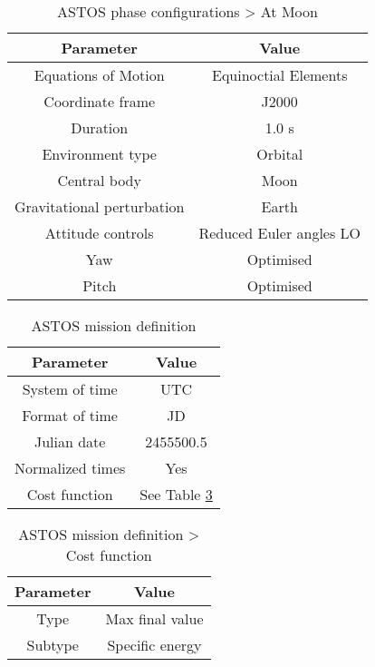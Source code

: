 \begin{table}
\caption{ASTOS phase configurations > At Moon}
\label{tab:ASTOS-phase-configurations>at-moon}
\begin{center}
\begin{tabular}{|cc|}
\hline
Parameter & Value\\
\hline
\hline
Equations of Motion & Equinoctial Elements\\
Coordinate frame & J2000\\
Duration & 1.0 s\\
Environment type & Orbital\\
Central body & Moon\\
Gravitational perturbation & Earth\\
Attitude controls & Reduced Euler angles LO\\
Yaw & Optimised\\
Pitch & Optimised\\
\hline
\end{tabular}
\end{center}
\end{table}

\newpage

\begin{table}
\caption{ASTOS mission definition}
\label{tab:ASTOS-mission-definition}
\begin{center}
\begin{tabular}{|cc|}
\hline
Parameter & Value\\
\hline
\hline
System of time & UTC\\
Format of time & JD\\
Julian date & 2455500.5\\
Normalized times & Yes\\
Cost function & See Table \ref{tab:ASTOS-mission-definition>cost-function}\\
\hline
\end{tabular}
\end{center}
\end{table}

\begin{table}
\caption{ASTOS mission definition > Cost function}
\label{tab:ASTOS-mission-definition>cost-function}
\begin{center}
\begin{tabular}{|cc|}
\hline
Parameter & Value\\
\hline
\hline
Type & Max final value\\
Subtype & Specific energy\\
\hline
\end{tabular}
\end{center}
\end{table}